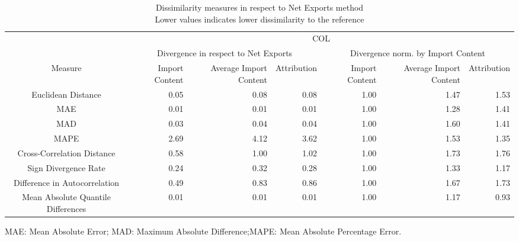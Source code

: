 \begin{table}[t]
\caption*{
{\large Dissimilarity measures in respect to Net Exports method} \\ 
{\small Lower values indicates lower dissimilarity to the reference}
} 
\fontsize{15.0pt}{18.0pt}\selectfont
\begin{tabular*}{\linewidth}{@{\extracolsep{\fill}}crrrrrr}
\toprule
 & \multicolumn{6}{c}{COL} \\ 
\cmidrule(lr){2-7}
 & \multicolumn{3}{c}{Divergence in respect to Net Exports} & \multicolumn{3}{c}{Divergence norm. by Import Content} \\ 
\cmidrule(lr){2-4} \cmidrule(lr){5-7}
Measure & Import Content & Average Import Content & Attribution & Import Content & Average Import Content & Attribution \\ 
\midrule\addlinespace[2.5pt]
Euclidean Distance & 0.05 & 0.08 & 0.08 & 1.00 & 1.47 & 1.53 \\ 
MAE & 0.01 & 0.01 & 0.01 & 1.00 & 1.28 & 1.41 \\ 
MAD & 0.03 & 0.04 & 0.04 & 1.00 & 1.60 & 1.41 \\ 
MAPE & 2.69 & 4.12 & 3.62 & 1.00 & 1.53 & 1.35 \\ 
Cross-Correlation Distance & 0.58 & 1.00 & 1.02 & 1.00 & 1.73 & 1.76 \\ 
Sign Divergence Rate & 0.24 & 0.32 & 0.28 & 1.00 & 1.33 & 1.17 \\ 
Difference in Autocorrelation & 0.49 & 0.83 & 0.86 & 1.00 & 1.67 & 1.73 \\ 
Mean Absolute Quantile Differences & 0.01 & 0.01 & 0.01 & 1.00 & 1.17 & 0.93 \\ 
\bottomrule
\end{tabular*}
\begin{minipage}{\linewidth}
MAE: Mean Absolute Error; MAD: Maximum Absolute Difference;MAPE: Mean Absolute Percentage Error.\\
\end{minipage}
\end{table}

